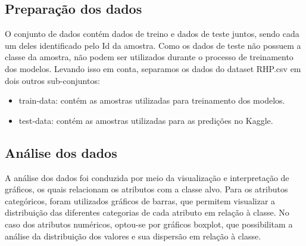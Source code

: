 \documentclass[10pt, conference, compsocconf]{IEEEtran}
\begin{document}
\subsection{Preparação dos dados}
O conjunto de dados contém dados de treino e dados de teste juntos, sendo cada um deles identificado pelo Id da amostra. Como os dados de teste
não possuem a classe da amostra, não podem ser utilizados durante o processo de treinamento dos modelos. Levando isso em conta, separamos os dados do
dataset RHP.csv em dois outros sub-conjuntos:

\begin{itemize}
  \item train-data: contém as amostras utilizadas para treinamento dos modelos.
  \item test-data: contém as amostras utilizadas para as predições no Kaggle.
\end{itemize}

\vspace{0.3cm}

\subsection{Análise dos dados}
A análise dos dados foi conduzida por meio da visualização e interpretação de gráficos, os quais relacionam os atributos 
com a classe alvo. Para os atributos categóricos, foram utilizados gráficos de barras, que 
permitem visualizar a distribuição das diferentes categorias de cada atributo em relação à classe. 
No caso dos atributos numéricos, optou-se por gráficos boxplot, que possibilitam a análise da distribuição dos valores e sua 
dispersão em relação à classe.
\end{document}
